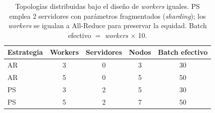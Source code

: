 \begin{table}[H]\centering
\caption{Topolog\'ias distribuidas bajo el dise\~no de \emph{workers} iguales. PS emplea 2 servidores con par\'ametros fragmentados (\emph{sharding}); los \emph{workers} se igualan a All-Reduce para preservar la equidad. Batch efectivo $=$ \emph{workers}$\,\times\,$10.}\label{tab:configs}
\footnotesize
\begin{tabular}{lcccc}\toprule
Estrategia & Workers & Servidores & Nodos & Batch efectivo\\\midrule
AR & 3 & 0 & 3 & 30\\
AR & 5 & 0 & 5 & 50\\
PS & 3 & 2 & 5 & 30\\
PS & 5 & 2 & 7 & 50\\
\bottomrule\end{tabular}
\end{table}
